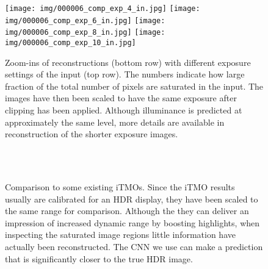 \documentclass[acmtog]{acmart}
\newcommand\belowfigspace{-2pt}
\begin{document}
\begin{figure}
	\vspace{5pt}
	\newcommand\ww{0.116}
	\centering
	\texttt{[image: img/000006\_comp\_exp\_4\_in.jpg]}
	\texttt{[image: img/000006\_comp\_exp\_6\_in.jpg]}
	\texttt{[image: img/000006\_comp\_exp\_8\_in.jpg]}
	\texttt{[image: img/000006\_comp\_exp\_10\_in.jpg]}\\
	\vspace{-2pt}
	\vspace{-10pt}
	\caption{\label{fig:exp} Zoom-ins of reconstructions (bottom row) with different exposure settings of the input (top row). The numbers indicate how large fraction of the total number of pixels are saturated in the input. The images have then been scaled to have the same exposure after clipping has been applied. Although illuminance is predicted at approximately the same level, more details are available in reconstruction of the shorter exposure images.}
	\vspace{\belowfigspace}
\end{figure}

\begin{figure}
	\newcommand\ww{0.23}
	\centering
	\\
	\vspace{-5pt}
	\\
	\vspace{-5pt}
	\vspace{-10pt}
	\caption{\label{fig:itmos} Comparison to some existing iTMOs. Since the iTMO results usually are calibrated for an HDR display, they have been scaled to the same range for comparison. Although the they can deliver an impression of increased dynamic range by boosting highlights, when inspecting the saturated image regions little information have actually been reconstructed. The CNN we use can make a prediction that is significantly closer to the true HDR image.}
	\vspace{\belowfigspace}
\end{figure}
\end{document}
